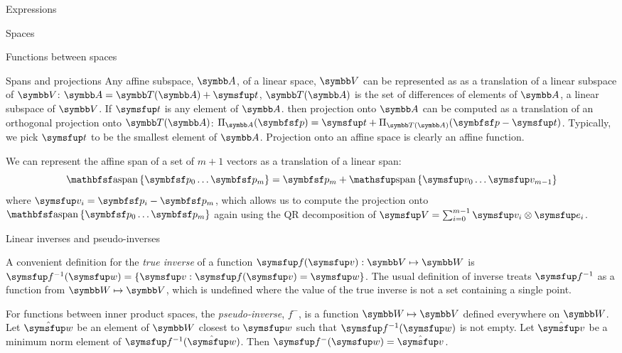 \documentclass{PalisadesLakesArticle}
\begin{document}
\begin{plSection}{Expressions}
\begin{plSection}{Spaces}
\begin{plSection}{Functions between spaces}
\begin{plSection}{Spans and projections}
Any affine subspace, $\Space{A}$, of a linear space, $\Space{V}$ can be represented as
as a translation of a linear subspace of $\Space{V}$:
$\Space{A} = \Space{T}(\Space{A}) + \Vector{t}$,
$\Space{T}(\Space{A})$ is the set of differences of elements of $\Space{A}$,
a linear subspace of $\Space{V}$.
If $\Vector{t}$ is any element of $\Space{A}$.
then projection onto $\Space{A}$
can be computed as a translation of an orthogonal projection onto $\Space{T}(\Space{A})$:
$\Projection_{\Space{A}} (\Point{p}) = \Vector{t} + \Projection_{\Space{T}(\Space{A})} (\Point{p} - \Vector{t})$.
Typically, we pick $\Vector{t}$ to be the smallest element of $\Space{A}$.
Projection onto an affine space is clearly an affine function.

We can represent the affine span of a set of $m+1$ vectors
as a translation of a linear span:
\begin{equation}
\affinespan\left\{ \Point{p}_0 \ldots \Point{p}_{m} \right\} = \Point{p}_m + \linearspan\left\{\Vector{v}_0 \ldots \Vector{v}_{m-1}\right\}
\end{equation}
where $\Vector{v}_i = \Point{p}_i - \Point{p}_m$,
which allows us to compute the projection onto
$\affinespan\left\{ \Point{p}_0 \ldots \Point{p}_{m} \right\}$
again using the QR decomposition
of $\Vector{V} = \sum_{i=0}^{m-1} \Vector{v}_i \otimes \Vector{e}_i$.

\end{plSection}%
\begin{plSection}{Linear inverses and pseudo-inverses}
\label{sec:Linear-inverses-and-pseudo-inverses}

A convenient definition for the \textit{true inverse}
of a function $\Vector{f}(\Vector{v}):\Space{V} \mapsto \Space{W}$ is
$\Vector{f}^{-1}(\Vector{w}) = \left\{ \Vector{v} : \Vector{f}(\Vector{v}) = \Vector{w} \right\}$.
The usual definition of inverse treats $\Vector{f}^{-1}$
as a function from $\Space{W} \mapsto \Space{V}$,
which is undefined where the value of the true
inverse is not a set containing a single point.

For functions between inner product spaces,
the \textit{pseudo-inverse}, $f^{-}$, is a function $\Space{W} \mapsto \Space{V}$
defined everywhere on $\Space{W}$.
Let $\hat{\Vector{w}}$ be an element of $\Space{W}$ closest to $\Vector{w}$
such that $\Vector{f}^{-1}(\Vector{w})$ is not empty.
Let $\hat{\Vector{v}}$ be a minimum norm element of $\Vector{f}^{-1}(\hat{\Vector{w}})$.
Then $\Vector{f}^{-}(\Vector{w}) = \hat{\Vector{v}}$.


\end{plSection}
\end{plSection}
\end{plSection}
\end{plSection}
\end{document}
